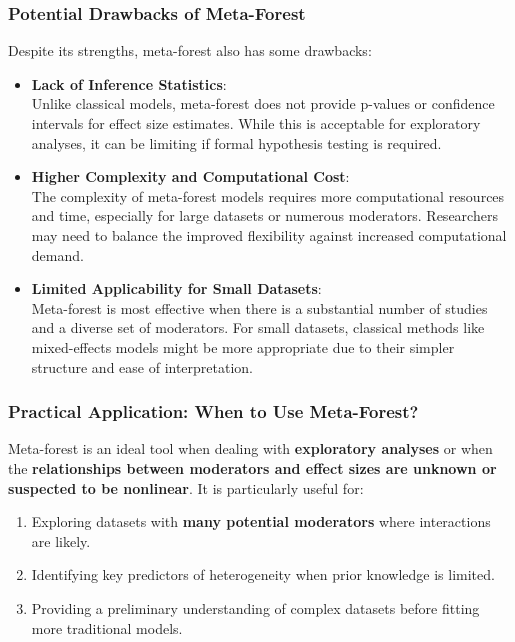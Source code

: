 \documentclass[
]{book}
\begin{document}
\subsubsection{Potential Drawbacks of Meta-Forest}\label{potential-drawbacks-of-meta-forest}

Despite its strengths, meta-forest also has some drawbacks:

\begin{itemize}
\item
  \textbf{Lack of Inference Statistics}:\\
  Unlike classical models, meta-forest does not provide p-values or confidence intervals for effect size estimates. While this is acceptable for exploratory analyses, it can be limiting if formal hypothesis testing is required.
\item
  \textbf{Higher Complexity and Computational Cost}:\\
  The complexity of meta-forest models requires more computational resources and time, especially for large datasets or numerous moderators. Researchers may need to balance the improved flexibility against increased computational demand.
\item
  \textbf{Limited Applicability for Small Datasets}:\\
  Meta-forest is most effective when there is a substantial number of studies and a diverse set of moderators. For small datasets, classical methods like mixed-effects models might be more appropriate due to their simpler structure and ease of interpretation.
\end{itemize}

\subsubsection{Practical Application: When to Use Meta-Forest?}\label{practical-application-when-to-use-meta-forest}

Meta-forest is an ideal tool when dealing with \textbf{exploratory analyses} or when the \textbf{relationships between moderators and effect sizes are unknown or suspected to be nonlinear}. It is particularly useful for:

\begin{enumerate}
\def\labelenumi{\arabic{enumi}.}
\item
  Exploring datasets with \textbf{many potential moderators} where interactions are likely.
\item
  Identifying key predictors of heterogeneity when prior knowledge is limited.
\item
  Providing a preliminary understanding of complex datasets before fitting more traditional models.
\end{enumerate}
\end{document}
